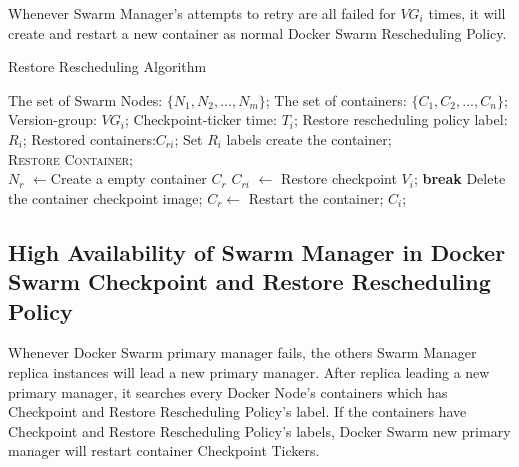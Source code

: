 Whenever Swarm Manager's attempts to retry are all failed for $ VG_i $ times, it will create and restart a new container as normal Docker Swarm Rescheduling Policy.

\begin{algorithm}[h]
    \caption{Restore Rescheduling Algorithm}
    \label{code:Restore}
    \begin{algorithmic}[1]
    	\Require
		The set of Swarm Nodes: $ \lbrace N_1,N_2,...,N_m \rbrace $;
		The set of containers: $ \lbrace C_1,C_2,...,C_n \rbrace $;
		Version-group: $ VG_i $;
		Checkpoint-ticker time: $ T_i $;
		Restore rescheduling policy label:$ R_i $;
	\Ensure
		Restored containers:$ C_{ri} $;
        \State Set $ R_i $ labels create the container;
        \\
        		\State \textsc{Restore Container};
        	\EndFor
        \EndIf
        \\
			\State $ N_r $ $\longleftarrow$Create a empty container $ C_r $
				\State $ C_{ri} $ $\longleftarrow$ Restore checkpoint $ V_i $;
					\State \textbf{break}
				\EndIf
			\EndFor
			\State Delete the container checkpoint image;
				\State $ C_r \longleftarrow $ Restart the container; $C_i$;
			\EndIf
		\EndProcedure
	\end{algorithmic}
\end{algorithm}

\subsection{High Availability of Swarm Manager in Docker Swarm Checkpoint and Restore Rescheduling Policy}
Whenever Docker Swarm primary manager fails, the others Swarm Manager replica instances will lead a new primary manager. After replica leading a new primary manager, it searches every Docker Node's containers which has Checkpoint and Restore Rescheduling Policy's label. If the containers have Checkpoint and Restore Rescheduling Policy's labels, Docker Swarm new primary manager will restart container Checkpoint Tickers.